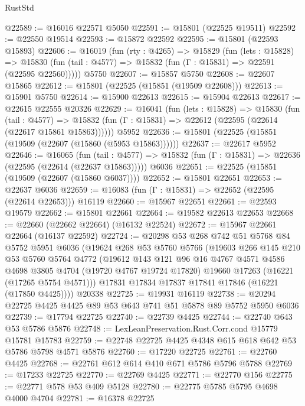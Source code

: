 \begin{lexlean}{RustStd}
\begin{coremodule}
@22589 := @16016 @22571 @5050
@22591 := @15801 (@22525 @19511)
@22592 := @22550 @19514
@22593 := @15872 @22592
@22595 := @15801 (@22593 @15893)
@22606 := @16019
    (fun (rty : @4265) =>
    @15829
      (fun (lets : @15828) =>
      @15830 (fun (tail : @4577) => @15832 (fun (Γ : @15831) => @22591 (@22595 @22560)))))
    @5750
@22607 := @15857 @5750
@22608 := @22607 @15865
@22612 := @15801 (@22525 (@15851 (@19509 @22608)))
@22613 := @15901 @5750
@22614 := @15900 @22613
@22615 := @15904 @22613
@22617 := @22615 @22555 @20326
@22629 := @16041
    (fun (lets : @15828) =>
    @15830
      (fun (tail : @4577) =>
      @15832 (fun (Γ : @15831) => @22612 (@22595 (@22614 (@22617 @15861 @15863))))))
    @5952
@22636 := @15801 (@22525 (@15851 (@19509 (@22607 (@15860 (@5953 @15863))))))
@22637 := @22617 @5952
@22646 := @16065
    (fun (tail : @4577) => @15832 (fun (Γ : @15831) => @22636 (@22595 (@22614 (@22637 @15863)))))
    @6036
@22651 := @22525 (@15851 (@19509 (@22607 (@15860 @6037))))
@22652 := @15801 @22651
@22653 := @22637 @6036
@22659 := @16083 (fun (Γ : @15831) => @22652 (@22595 (@22614 @22653))) @16119
@22660 := @15967 @22651
@22661 := @22593 @19579
@22662 := @15801 @22661
@22664 := @19582 @22613 @22653
@22668 := @22660 (@22662 @22664) (@16132 @22524)
@22672 := @15967 @22661 @22664 (@16137 @22592)
@22724 := @20298
    @53
    @268
    @742
    @51
    @5768
    @84
    @5752
    @5951
    @6036
    (@19624
      @268
      @53
      @5760
      @5766
      (@19603
        @266
        @145
        @210
        @53
        @5760
        @5764
        @4772
        (@19612
          @143
          @121
          @96
          @16
          @4767
          @4571
          @4586
          @4698
          @3805
          @4704
          (@19720 @4767 @19724 @17820)
          @19660
          @17263
          (@16221 (@17265 @5754 @4571)))
        @17831
        @17834
        @17837
        @17841
        @17846
        (@16221 (@17850 @4425))))
    @20338
@22725 := @19931 @16119
@22738 := @20294 @22725 @4425 @4425 @89 @53 @643 @741 @51 @5878 @89 @5752 @5950 @6036
@22739 := @17794 @22725
@22740 := @22739 @4425
@22744 := @22740 @643 @53 @5786 @5876
@22748 := LexLeanPreservation.Rust.Corr.cond @15779 @15781 @15783
@22759 := @22748 @22725 @4425 @4348 @615 @618 @642 @53 @5786 @5798 @4571 @5876
@22760 := @17220 @22725
@22761 := @22760 @4425
@22768 := @22761 @612 @614 @410 @671 @5786 @5796 @5788
@22769 := @17233 @22725
@22770 := @22769 @4425
@22771 := @22770 @156
@22775 := @22771 @578 @53 @409 @5128
@22780 := @22775 @5785 @5795 @4698 @4000 @4704
@22781 := @16378 @22725

\end{coremodule}
\end{lexlean}
